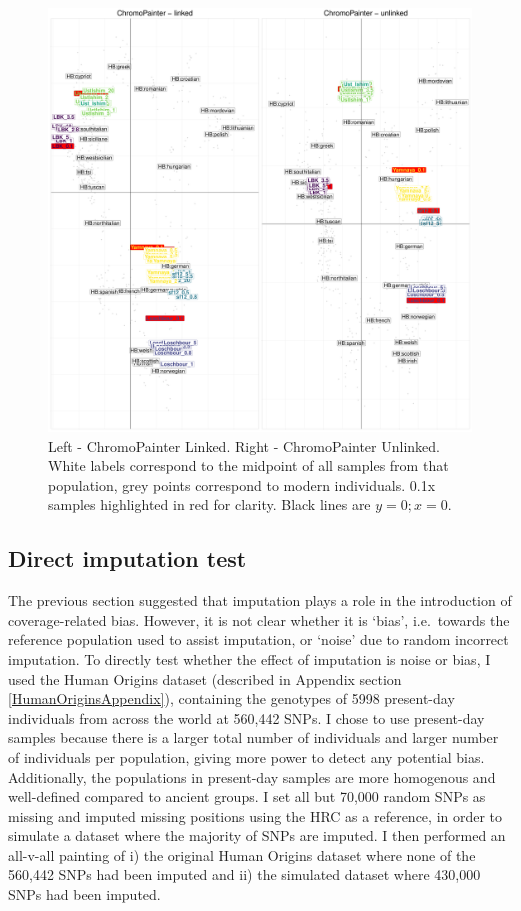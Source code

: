 {\begin{figure}[htp]
    \centering
    \includegraphics[width=1.0\textwidth]{../images/chapter1/CP_linked_unlinked.pdf}
    \caption{Left - ChromoPainter Linked. Right - ChromoPainter Unlinked. White labels correspond to the midpoint of all samples from that population, grey points correspond to modern individuals. 0.1x samples highlighted in red for clarity. Black lines are $y=0; x=0$.}
    \label{fig:CP_linked_unlinked}
\end{figure}

\subsection{Direct imputation test} \label{DirectImputationTest}

The previous section suggested that imputation plays a role in the introduction of coverage-related bias. However, it is not clear whether it is `bias', i.e.\ towards the reference population used to assist imputation, or `noise' due to random incorrect imputation. To directly test whether the effect of imputation is noise or bias, I used the Human Origins dataset (described in Appendix section \ref{HumanOriginsAppendix}), containing the genotypes of 5998 present-day individuals from across the world at 560,442 SNPs. I chose to use present-day samples because there is a larger total number of individuals and larger number of individuals per population, giving more power to detect any potential bias. Additionally, the populations in present-day samples are more homogenous and well-defined compared to ancient groups. I set all but 70,000 random SNPs as missing and imputed missing positions using the HRC as a reference, in order to simulate a dataset where the majority of SNPs are imputed. I then performed an all-v-all painting of i) the original Human Origins dataset where none of the 560,442 SNPs had been imputed and ii) the simulated dataset where 430,000 SNPs had been imputed. 

}
